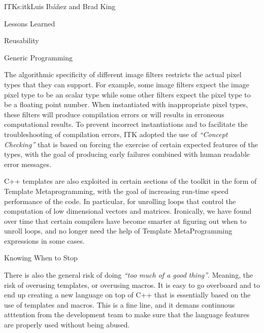 \begin{aosachapter}{ITK}{s:itk}{Luis Ib\'{a}\~{n}ez and Brad King}
\begin{aosasect1}{Lessons Learned}
\begin{aosasect2}{Reusability}
\begin{aosasect3}{Generic Programming}
\begin{aosaitemize}
\item {}
\item {}
\end{aosaitemize}

The algorithmic specificity of different image filters restricts the actual
pixel types that they can support. For example, some image filters expect the
image pixel type to be an scalar type while some other filters expect the pixel
type to be a floating point number. When instantiated with inappropriate pixel
types, these filters will produce compilation errors or will results in
erroneous computational results. To prevent incorrect instantiations and to
facilitate the troubleshooting of compilation errors, ITK adopted the use of
\emph{``Concept Checking''} that is based on forcing the exercise of certain
expected features of the types, with the goal of producing early failures
combined with human readable error messages.

C++ templates are also exploited in certain sections of the toolkit in the form
of Template Metaprogramming, with the goal of increasing run-time speed
performance of the code. In particular, for unrolling loops that control the
computation of low dimensional vectors and matrices. Ironically, we have found
over time that certain compilers have become smarter at figuring out when to
unroll loops, and no longer need the help of Template MetaProgramming
expressions in some cases.

\end{aosasect3}


\begin{aosasect3}{Knowing When to Stop}

There is also the general risk of doing \emph{``too much of a good thing''}.
Meaning, the risk of overusing templates, or overusing macros. It is easy to go overboard and to end up creating a new
language on top of C++ that is essentially based on the use of templates and
macros. This is a fine line, and it demans continuous atttention from the
development team to make sure that the language features are properly used
without being abused.


\end{aosasect3}
\end{aosasect2}
\end{aosasect1}
\end{aosachapter}
